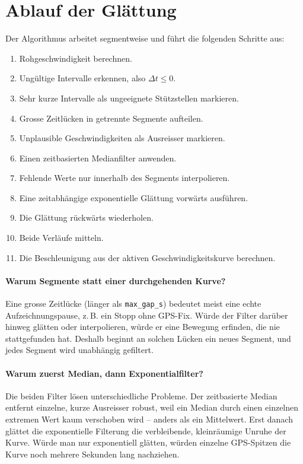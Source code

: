 \section{Ablauf der Glättung}

Der Algorithmus arbeitet segmentweise und führt die folgenden Schritte aus:
\begin{enumerate}
  \item Rohgeschwindigkeit berechnen.
  \item Ungültige Intervalle erkennen, also \(\Delta t \le 0\).
  \item Sehr kurze Intervalle als ungeeignete Stützstellen markieren.
  \item Grosse Zeitlücken in getrennte Segmente aufteilen.
  \item Unplausible Geschwindigkeiten als Ausreisser markieren.
  \item Einen zeitbasierten Medianfilter anwenden.
  \item Fehlende Werte nur innerhalb des Segments interpolieren.
  \item Eine zeitabhängige exponentielle Glättung vorwärts ausführen.
  \item Die Glättung rückwärts wiederholen.
  \item Beide Verläufe mitteln.
  \item Die Beschleunigung aus der aktiven Geschwindigkeitskurve berechnen.
\end{enumerate}

\paragraph{Warum Segmente statt einer durchgehenden Kurve?} Eine grosse Zeitlücke (länger als \texttt{max\_gap\_s}) bedeutet meist eine echte Aufzeichnungspause, z.\,B. ein Stopp ohne GPS-Fix. Würde der Filter darüber hinweg glätten oder interpolieren, würde er eine Bewegung erfinden, die nie stattgefunden hat. Deshalb beginnt an solchen Lücken ein neues Segment, und jedes Segment wird unabhängig gefiltert.

\paragraph{Warum zuerst Median, dann Exponentialfilter?} Die beiden Filter lösen unterschiedliche Probleme. Der zeitbasierte Median entfernt einzelne, kurze Ausreisser robust, weil ein Median durch einen einzelnen extremen Wert kaum verschoben wird -- anders als ein Mittelwert. Erst danach glättet die exponentielle Filterung die verbleibende, kleinräumige Unruhe der Kurve. Würde man nur exponentiell glätten, würden einzelne GPS-Spitzen die Kurve noch mehrere Sekunden lang nachziehen.

